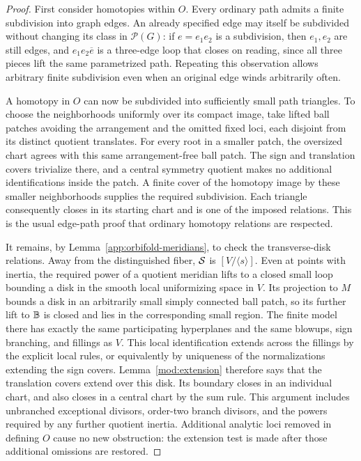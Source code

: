 \begin{proof}
First consider homotopies within $O$.  Every ordinary path admits a
finite subdivision into graph edges.  An already specified edge may
itself be subdivided without changing its class in $\mathcal P(G)$:
if $e=e_1e_2$ is a subdivision, then $e_1,e_2$ are still edges, and
$e_1e_2\overline e$ is a three-edge loop that closes on reading,
since all three pieces lift the same parametrized path.  Repeating
this observation allows arbitrary finite subdivision even when an
original edge winds arbitrarily often.

A homotopy in $O$ can now be subdivided into sufficiently small path
triangles.  To choose the neighborhoods uniformly over its compact
image, take lifted ball patches avoiding the arrangement and the
omitted fixed loci, each disjoint from its distinct quotient
translates.  For every root in a smaller patch, the oversized chart
agrees with this same arrangement-free ball patch.  The sign and
translation covers trivialize there, and a central symmetry quotient
makes no additional identifications inside the patch.  A finite
cover of the homotopy image by these smaller neighborhoods supplies
the required subdivision.  Each triangle consequently closes in its
starting chart and is one of the imposed relations.  This is the
usual edge-path proof that ordinary homotopy relations are respected.

It remains, by Lemma~\ref{app:orbifold-meridians}, to check the
transverse-disk relations.  Away from the distinguished fiber,
$\mathcal S$ is $[V/\langle s\rangle]$.  Even at points with inertia, the
required power of a quotient meridian lifts to a closed small loop
bounding a disk in the smooth local uniformizing space in $V$.
Its projection to $M$ bounds a disk in an arbitrarily small
simply connected ball patch, so its further lift to $\mathbb B$ is closed
and lies in the corresponding small region.  The finite model there
has exactly the same participating hyperplanes and the same blowups, sign branching, and fillings as
$V$.  This local identification extends across the fillings by the
explicit local rules, or equivalently by uniqueness of the
normalizations extending the sign covers.  Lemma~\ref{mod:extension}
therefore says that the translation covers extend over this disk.
Its boundary closes in an individual chart, and also closes in a
central chart by the sum rule.  This argument includes unbranched
exceptional divisors, order-two branch divisors, and the powers
required by any further quotient inertia.  Additional analytic loci
removed in defining $O$ cause no new obstruction: the extension test
is made after those additional omissions are restored.


\end{proof}
